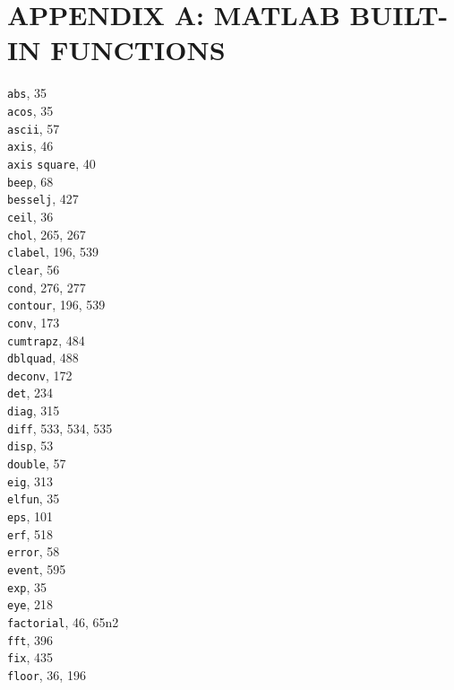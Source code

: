 \documentclass[../main.tex]{subfiles}
\begin{document}
\chapter*{APPENDIX A: MATLAB BUILT-IN FUNCTIONS}

\begin{multicols}{3}

    \noindent\texttt{abs}, 35\\
    \texttt{acos}, 35\\
    \texttt{ascii}, 57\\
    \texttt{axis}, 46\\
    \texttt{axis} \texttt{square}, 40\\
    \texttt{beep}, 68\\
    \texttt{besselj}, 427\\
    \texttt{ceil}, 36\\
    \texttt{chol}, 265, 267\\
    \texttt{clabel}, 196, 539\\
    \texttt{clear}, 56\\
    \texttt{cond}, 276, 277\\
    \texttt{contour}, 196, 539\\
    \texttt{conv}, 173\\
    \texttt{cumtrapz}, 484\\
    \texttt{dblquad}, 488\\
    \texttt{deconv}, 172\\
    \texttt{det}, 234\\
    \texttt{diag}, 315\\
    \texttt{diff}, 533, 534, 535\\
    \texttt{disp}, 53\\
    \texttt{double}, 57\\
    \texttt{eig}, 313\\
    \texttt{elfun}, 35\\
    \texttt{eps}, 101\\
    \texttt{erf}, 518\\
    \texttt{error}, 58\\
    \texttt{event}, 595\\
    \texttt{exp}, 35\\
    \texttt{eye}, 218\\
    \texttt{factorial}, 46, 65n2\\
    \texttt{fft}, 396\\
    \texttt{fix}, 435\\
    \texttt{floor}, 36, 196\\

\end{multicols}
\end{document}
